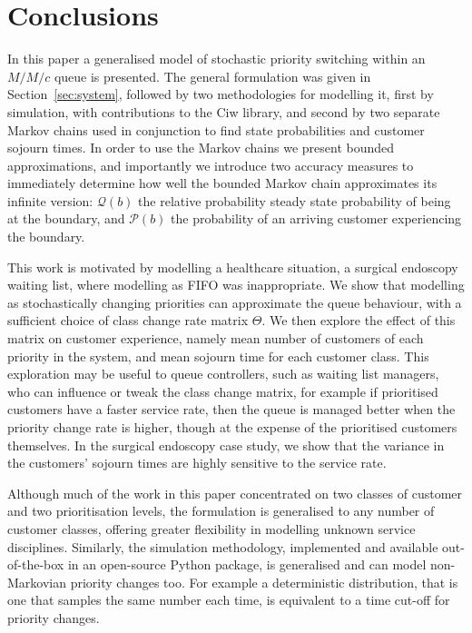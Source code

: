 \documentclass{article}
\begin{document}
\section{Conclusions}
In this paper a generalised model of stochastic priority switching within an
$M/M/c$ queue is presented. The general formulation was given in
Section~\ref{sec:system}, followed by two methodologies for modelling it,
first by simulation, with contributions to the Ciw library, and second by two
separate Markov chains used in conjunction to find state probabilities and
customer sojourn times. In order to use the Markov chains we present bounded
approximations, and importantly we introduce two accuracy measures to
immediately determine how well the bounded Markov chain approximates its
infinite version: $\mathcal{Q}(b)$ the relative probability steady state
probability of being at the boundary, and $\mathcal{P}(b)$ the probability of an
arriving customer experiencing the boundary.

This work is motivated by modelling a healthcare situation, a surgical endoscopy
waiting list, where modelling as FIFO was inappropriate. We show that modelling
as stochastically changing priorities can approximate the queue behaviour,
with a sufficient choice of class change rate matrix $\Theta$. We then explore
the effect of this matrix on customer experience, namely mean number of
customers of each priority in the system, and mean sojourn time for each
customer class. This exploration may be useful to queue controllers, such as
waiting list managers, who can influence or tweak the class change matrix, for
example if prioritised customers have a faster service rate, then the queue is
managed better when the priority change rate is higher, though at the expense of
the prioritised customers themselves.
In the surgical endoscopy case study, we show that the variance in the
customers' sojourn times are highly sensitive to the service rate.

Although much of the work in this paper concentrated on two classes of customer
and two prioritisation levels, the formulation is generalised to any number of
customer classes, offering greater flexibility in modelling unknown service
disciplines. Similarly, the simulation methodology, implemented and available
out-of-the-box in an open-source Python package, is generalised and can model
non-Markovian priority changes too. For example a deterministic distribution,
that is one that samples the same number each time, is equivalent to a time
cut-off for priority changes.
\end{document}
